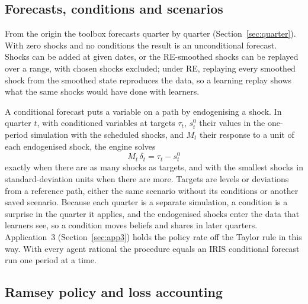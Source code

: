 \documentclass[pdflatex,sn-basic]{sn-jnl}
\begin{document}
\subsection{Forecasts, conditions and scenarios}\label{sec:forecasts}

From the origin the toolbox forecasts quarter by quarter (Section~\ref{sec:quarter}). With zero
shocks and no conditions the result is an unconditional forecast. Shocks can be added at given
dates, or the RE-smoothed shocks can be replayed over a range, with chosen shocks excluded; under
RE, replaying every smoothed shock from the smoothed state reproduces the data, so a learning
replay shows what the same shocks would have done with learners.

A conditional forecast puts a variable on a path by endogenising a shock. In quarter $t$, with
conditioned variables at targets $\tau_t$, $s^0_t$ their values in the one-period simulation
with the scheduled shocks, and $M_t$ their response to a unit of each endogenised shock, the engine
solves
\begin{equation}\label{eq:cond}
  M_t\,\delta_t = \tau_t - s^0_t
\end{equation}
exactly when there are as many shocks as targets, and with the smallest shocks in
standard-deviation units when there are more. Targets are levels or deviations from a reference
path, either the same scenario without its conditions or another saved scenario. Because each
quarter is a separate simulation, a condition is a surprise in the quarter it applies, and the
endogenised shocks enter the data that learners see, so a condition moves beliefs and shares in
later quarters. Application~3 (Section~\ref{sec:app3}) holds the policy rate off the Taylor rule
in this way. With every agent rational the procedure equals an IRIS conditional forecast run one
period at a time.

\subsection{Ramsey policy and loss accounting}\label{sec:ramsey}
\end{document}
